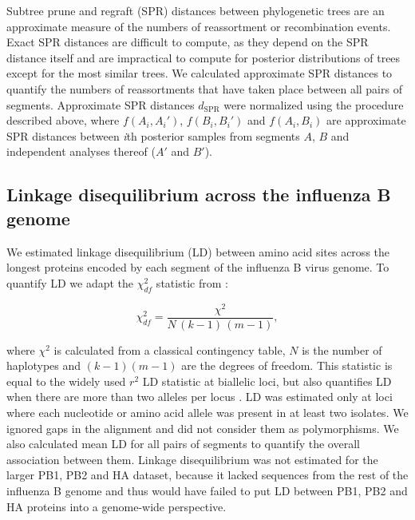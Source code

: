 \documentclass[11pt,oneside,letterpaper]{article}
\newcommand{\chiSq}{\chi^{2}_{df}}
\newcommand{\dspr}{d_\mathrm{SPR}}
\begin{document}
Subtree prune and regraft (SPR) distances between phylogenetic trees are an approximate measure of the numbers of reassortment or recombination events.
Exact SPR distances are difficult to compute, as they depend on the SPR distance itself and are impractical to compute for posterior distributions of trees except for the most similar trees.
We calculated approximate SPR distances \cite{whidden2009,whidden2010,whidden2013} to quantify the numbers of reassortments that have taken place between all pairs of segments.
Approximate SPR distances $\dspr$ were normalized using the procedure described above, where $f(A_i, A_i')$, $f(B_i, B_i')$ and $f(A_i, B_i)$ are approximate SPR distances between \textit{i}th posterior samples from segments $A$, $B$ and independent analyses thereof ($A'$ and $B'$).

\subsection*{Linkage disequilibrium across the influenza B genome}
We estimated linkage disequilibrium (LD) between amino acid sites across the longest proteins encoded by each segment of the influenza B virus genome.
To quantify LD we adapt the $\chiSq$ statistic from \cite{hedrick1986}:

\begin{equation}
\chiSq=\frac{\chi^{2}}{N\,(k-1)\,(m-1)},
\end{equation}

where $\chi^{2}$ is calculated from a classical contingency table, $N$ is the number of haplotypes and $(k-1)(m-1)$ are the degrees of freedom.
This statistic is equal to the widely used $r^2$ LD statistic at biallelic loci, but also quantifies LD when there are more than two alleles per locus \cite{zhao2005}.
LD was estimated only at loci where each nucleotide or amino acid allele was present in at least two isolates.
We ignored gaps in the alignment and did not consider them as polymorphisms.
We also calculated mean LD for all pairs of segments to quantify the overall association between them.
Linkage disequilibrium was not estimated for the larger PB1, PB2 and HA dataset, because it lacked sequences from the rest of the influenza B genome and thus would have failed to put LD between PB1, PB2 and HA proteins into a genome-wide perspective.

\setcounter{figure}{0}
\setcounter{table}{0}
\renewcommand{\thefigure}{S\arabic{figure}}
\renewcommand{\thetable}{S\arabic{table}}
\end{document}
